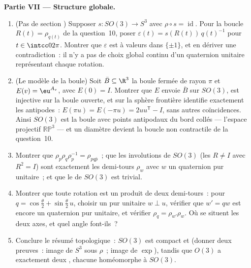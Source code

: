 \begin{problem}
\medskip
\noindent\textbf{Partie VII --- Structure globale.}
\begin{enumerate}[resume]
  \item (Pas de section ) Supposer $s \colon SO(3)
        \to S^3$  avec $\rho \circ s =
        \operatorname{id}$. Pour la boucle $R(t) =
        \rho_{q(t)}$ de la question~10, poser
        $\varepsilon(t) = s(R(t))\,q(t)^{-1}$ pour $t \in
        \intcc0{2\pi}$. Montrer que $\varepsilon$ est
         à valeurs dans $\{\pm1\}$, et en dériver une
        contradiction~: il n'y a pas de choix global continu
        d'un quaternion unitaire représentant chaque
        rotation.
  \item (Le modèle de la boule) Soit $\bar B \subseteq \R^3$
        la boule fermée de rayon $\pi$ et $E(v) = \eu^{A_v}$,
        avec $E(0) = I$. Montrer que $E$ envoie $\bar B$ sur
        $SO(3)$, est injective sur la boule ouverte, et sur
        la sphère frontière identifie exactement les
        antipodes~: $E(\pi u) = E(-\pi u) = 2uu^{\mathsf T}
        - I$, sans autres coïncidences. Ainsi $SO(3)$ est la
        boule avec points antipodaux du bord collés ---
        l'espace projectif $\mathbb{RP}^3$ --- et un diamètre
        devient la boucle non contractile de la question~10.
  \item Montrer que $\rho_p\rho_q\rho_p^{-1} =
        \rho_{pq\bar p}$~; que les involutions de $SO(3)$
        (les $R \neq I$ avec $R^2 = I$) sont exactement les
        demi-tours $\rho_w$ avec $w$ un quaternion pur
        unitaire~; et que le  de $SO(3)$ est trivial.
  \item Montrer que toute rotation est un produit de deux
        demi-tours~: pour $q = \cos\frac\theta2 +
        \sin\frac\theta2\,u$, choisir un pur unitaire $w
        \perp u$, vérifier que $w' = qw$ est encore un
        quaternion pur unitaire, et vérifier $\rho_q =
        \rho_{w'}\rho_w$. Où se situent les deux axes, et
        quel angle font-ils~?
  \item Conclure le résumé topologique~: $SO(3)$ est compact
        et  (donner deux preuves~: image
         de $S^3$ sous $\rho$~; image de $\exp$),
        tandis que $O(3)$ a exactement deux , chacune homéomorphe à $SO(3)$.


\end{enumerate}
\end{problem}
